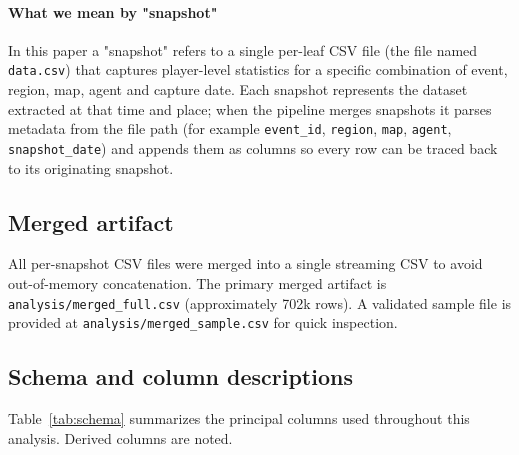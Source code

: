 \documentclass[11pt]{article}
\begin{document}
\paragraph{What we mean by "snapshot"}
In this paper a "snapshot" refers to a single per-leaf CSV file (the file named \texttt{data.csv}) that captures player-level statistics for a specific combination of event, region, map, agent and capture date. Each snapshot represents the dataset extracted at that time and place; when the pipeline merges snapshots it parses metadata from the file path (for example \texttt{event\_id}, \texttt{region}, \texttt{map}, \texttt{agent}, \texttt{snapshot\_date}) and appends them as columns so every row can be traced back to its originating snapshot.

\subsection{Merged artifact}
All per-snapshot CSV files were merged into a single streaming CSV to avoid out-of-memory concatenation. The primary merged artifact is \texttt{analysis/merged\_full.csv} (approximately 702k rows). A validated sample file is provided at \texttt{analysis/merged\_sample.csv} for quick inspection.

\subsection{Schema and column descriptions}
Table~\ref{tab:schema} summarizes the principal columns used throughout this analysis. Derived columns are noted.
\end{document}
